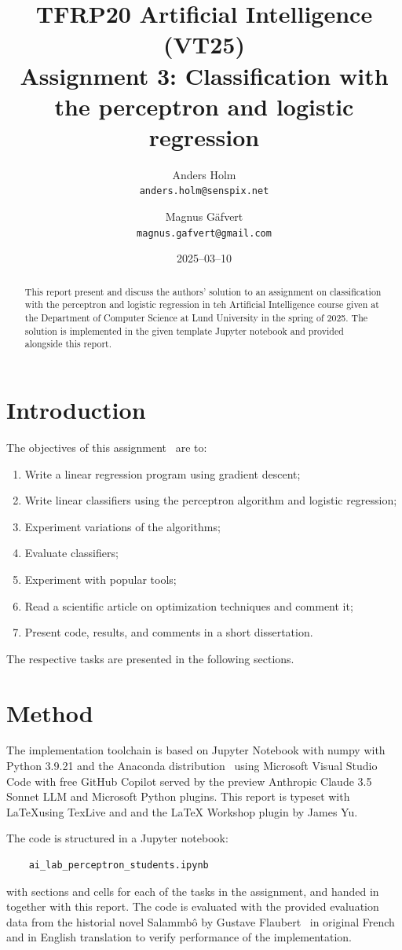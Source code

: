 \documentclass[a4paper]{article}
\title{TFRP20 Artificial Intelligence (VT25)\\ Assignment 3: Classification with the perceptron and logistic regression}
\author{Anders Holm\\\texttt{anders.holm@senspix.net} \and
Magnus Gäfvert\\\texttt{magnus.gafvert@gmail.com}}
\date{2025--03--10}
\begin{document}
\maketitle
\begin{abstract}
    This report present and discuss the authors' solution to an assignment on classification with the perceptron and logistic regression in teh Artificial Intelligence course given at the Department of Computer Science at Lund University in the spring of 2025. The solution is implemented in the given template Jupyter notebook and provided alongside this report.
\end{abstract}

\section{Introduction}
The objectives of this assignment~\cite{tfrp20assignment3} are to:

\begin{enumerate}
    \item  Write a linear regression program using gradient descent;
    \item  Write linear classifiers using the perceptron algorithm and logistic regression;
    \item  Experiment variations of the algorithms;
    \item  Evaluate classifiers;
    \item  Experiment with popular tools;
    \item  Read a scientific article on optimization techniques and comment it;
    \item  Present code, results, and comments in a short dissertation. 
\end{enumerate}

The respective tasks are presented in the following sections.

\section{Method}
The implementation toolchain is based on Jupyter Notebook with numpy with Python 3.9.21 and the Anaconda distribution~\cite{anaconda} using Microsoft Visual Studio Code with free GitHub Copilot served by the preview Anthropic Claude 3.5 Sonnet LLM and Microsoft Python plugins. This report is typeset with \LaTeX using TexLive and and the LaTeX Workshop plugin by James Yu.

The code is structured in a Jupyter notebook: 
\begin{verbatim}
    ai_lab_perceptron_students.ipynb    
\end{verbatim}
with sections and cells for each of the tasks in the assignment, and handed in together with this report. The code is evaluated with the provided evaluation data from the historial novel Salammbô by Gustave Flaubert~\cite{flaubert1862salammbô} in original French and in English translation to verify performance of the implementation.
\end{document}
